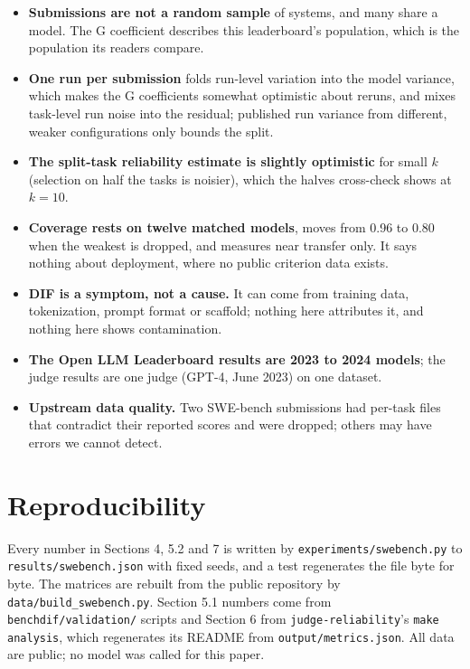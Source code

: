 \documentclass[11pt]{article}
\begin{document}
\begin{itemize}
\item \textbf{Submissions are not a random sample} of systems, and many share a model. The G coefficient describes this leaderboard's population, which is the population its readers compare.
\item \textbf{One run per submission} folds run-level variation into the model variance, which makes the G coefficients somewhat optimistic about reruns, and mixes task-level run noise into the residual; published run variance from different, weaker configurations only bounds the split.
\item \textbf{The split-task reliability estimate is slightly optimistic} for small $k$ (selection on half the tasks is noisier), which the halves cross-check shows at $k = 10$.
\item \textbf{Coverage rests on twelve matched models}, moves from 0.96 to 0.80 when the weakest is dropped, and measures near transfer only. It says nothing about deployment, where no public criterion data exists.
\item \textbf{DIF is a symptom, not a cause.} It can come from training data, tokenization, prompt format or scaffold; nothing here attributes it, and nothing here shows contamination.
\item \textbf{The Open LLM Leaderboard results are 2023 to 2024 models}; the judge results are one judge (GPT-4, June 2023) on one dataset.
\item \textbf{Upstream data quality.} Two SWE-bench submissions had per-task files that contradict their reported scores and were dropped; others may have errors we cannot detect.
\end{itemize}

\section*{Reproducibility}

{\sloppy Every number in Sections 4, 5.2 and 7 is written by \texttt{experiments/swebench.py} to \texttt{results/swebench.json} with fixed seeds, and a test regenerates the file byte for byte. The matrices are rebuilt from the public repository by \texttt{data/build\_swebench.py}. Section 5.1 numbers come from \texttt{benchdif/validation/} scripts and Section 6 from \texttt{judge-reliability}'s \texttt{make analysis}, which regenerates its README from \texttt{output/metrics.json}. All data are public; no model was called for this paper.\par}



\end{document}
